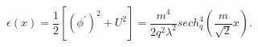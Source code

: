 \begin{equation}
\label{DE}
\epsilon(x)=\frac 12 \left[\left(\phi^{\prime}\right)^2+U^2\right]=
\frac{m^4}{2q^2\lambda^2}sech_q^4\left(\frac{m}{\sqrt 2}x \right).
\end{equation}

